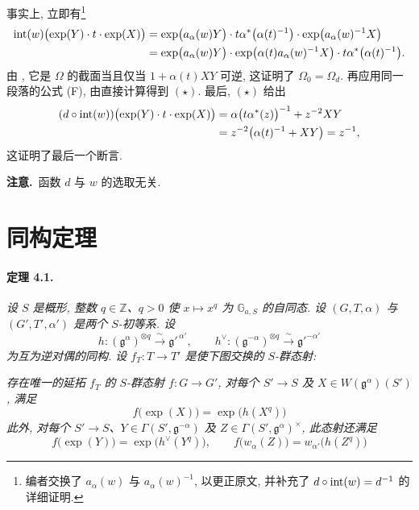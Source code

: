 事实上, 立即有\footnote{编者交换了 \(a_\alpha(w)\) 与 \(a_\alpha(w)^{-1}\), 以更正原文, 并补充了 \(d\circ\operatorname{int}(w)=d^{-1}\) 的详细证明.}
\[
\begin{aligned}
  \operatorname{int}(w)\bigl(\exp(Y)\cdot t\cdot\exp(X)\bigr)
   &=
   \exp\bigl(a_\alpha(w)Y\bigr)\cdot
   t\alpha^\ast\bigl(\alpha(t)^{-1}\bigr)\cdot
   \exp\bigl(a_\alpha(w)^{-1}X\bigr)\\
   &=
   \exp\bigl(a_\alpha(w)Y\bigr)\cdot
   \exp\bigl(\alpha(t)a_\alpha(w)^{-1}X\bigr)\cdot
   t\alpha^\ast\bigl(\alpha(t)^{-1}\bigr).
\end{aligned}
\]
由 , 它是 \(\Omega\) 的截面当且仅当 \(1+\alpha(t)XY\) 可逆, 这证明了 \(\Omega_0=\Omega_d\). 再应用同一段落的公式 \textup{(F)}, 由直接计算得到 \((\star)\). 最后, \((\star)\) 给出
\[
\begin{aligned}
  (d\circ\operatorname{int}(w))
    \bigl(\exp(Y)\cdot t\cdot\exp(X)\bigr)
   &=
   \alpha\bigl(t\alpha^\ast(z)\bigr)^{-1}
     +z^{-2}XY\\
   &=z^{-2}\bigl(\alpha(t)^{-1}+XY\bigr)
    =z^{-1},
\end{aligned}
\]
这证明了最后一个断言.

\smallskip
\noindent\textbf{注意.}\ 函数 \(d\) 与 \(w\) 的选取无关.

\section{同构定理}
\paragraph{\textbf{定理 4.1.}}
\emph{设 \(S\) 是概形, 整数 \(q\in\mathbb Z\)、\(q>0\) 使 \(x\mapsto x^q\) 为 \(\mathbb G_{a,S}\) 的自同态. 设 \((G,T,\alpha)\) 与 \((G',T',\alpha')\) 是两个 \(S\)-初等系. 设}
\[
  h\colon(\mathfrak g^\alpha)^{\otimes q}
      \xrightarrow{\ \sim\ }\mathfrak g'^{\,\alpha'},
  \qquad
  h^\vee\colon(\mathfrak g^{-\alpha})^{\otimes q}
      \xrightarrow{\ \sim\ }\mathfrak g'^{-\alpha'}
\]
\emph{为互为逆对偶的同构. 设 \(f_T\colon T\to T'\) 是使下图交换的 \(S\)-群态射:}
\begin{center}
\end{center}
\emph{存在唯一的延拓 \(f_T\) 的 \(S\)-群态射 \(f\colon G\to G'\), 对每个 \(S'\to S\) 及 \(X\in W(\mathfrak g^\alpha)(S')\), 满足}
\[
  f\bigl(\exp(X)\bigr)=\exp\bigl(h(X^q)\bigr)
\]
\emph{此外, 对每个 \(S'\to S\)、\(Y\in\Gamma(S',\mathfrak g^{-\alpha})\) 及 \(Z\in\Gamma(S',\mathfrak g^\alpha)^\times\), 此态射还满足}
\[
  f\bigl(\exp(Y)\bigr)=\exp\bigl(h^\vee(Y^q)\bigr),
  \qquad
  f\bigl(w_\alpha(Z)\bigr)
    =w_{\alpha'}\bigl(h(Z^q)\bigr)
\]

